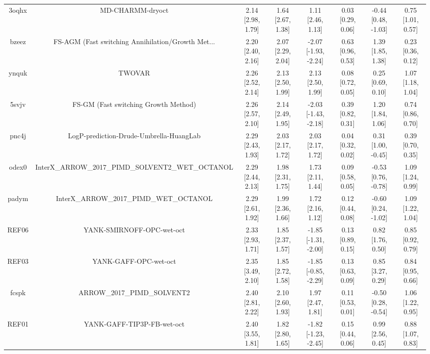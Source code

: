 \documentclass{article}
\begin{document}
\begin{center}
\begin{longtable}{|cccccccc|}
 3oqhx &                                   MD-CHARMM-dryoct &  2.14 [2.98, 1.79] &  1.64 [2.67, 1.38] &     1.11 [2.46, 1.13] &  0.03 [0.29, 0.06] &   -0.44 [0.48, -1.03] &     0.75 [1.01, 0.57] \\
 bzeez &  FS-AGM (Fast switching Annihilation/Growth Met... &  2.20 [2.40, 2.16] &  2.07 [2.29, 2.04] &  -2.07 [-1.93, -2.24] &  0.63 [0.96, 0.53] &     1.39 [1.85, 1.38] &     0.23 [0.36, 0.12] \\
 ynquk &                                             TWOVAR &  2.26 [2.52, 2.14] &  2.13 [2.50, 1.99] &     2.13 [2.50, 1.99] &  0.08 [0.72, 0.05] &     0.25 [0.69, 0.10] &     1.07 [1.18, 1.04] \\
 5svjv &               FS-GM (Fast switching Growth Method) &  2.26 [2.57, 2.10] &  2.14 [2.49, 1.95] &  -2.03 [-1.43, -2.18] &  0.39 [0.82, 0.31] &     1.20 [1.84, 1.06] &     0.74 [0.86, 0.70] \\
 pnc4j &            LogP-prediction-Drude-Umbrella-HuangLab &  2.29 [2.43, 1.93] &  2.03 [2.17, 1.72] &     2.03 [2.17, 1.72] &  0.04 [0.32, 0.02] &    0.31 [1.00, -0.45] &     0.39 [0.70, 0.35] \\
 odex0 &  InterX\_ARROW\_2017\_PIMD\_SOLVENT2\_WET\_OCTANOL &  2.29 [2.44, 2.13] &  1.98 [2.31, 1.75] &     1.73 [2.11, 1.44] &  0.09 [0.58, 0.05] &   -0.53 [0.76, -0.78] &     1.09 [1.24, 0.99] \\
 padym &            InterX\_ARROW\_2017\_PIMD\_WET\_OCTANOL &  2.29 [2.61, 1.92] &  1.99 [2.36, 1.66] &     1.72 [2.16, 1.12] &  0.12 [0.44, 0.08] &   -0.60 [0.24, -1.02] &     1.09 [1.22, 1.04] \\
 REF06 &                          YANK-SMIRNOFF-OPC-wet-oct &  2.33 [2.93, 1.71] &  1.85 [2.37, 1.57] &  -1.85 [-1.31, -2.00] &  0.13 [0.89, 0.15] &     0.82 [1.76, 0.50] &     0.85 [0.92, 0.79] \\
 REF03 &                              YANK-GAFF-OPC-wet-oct &  2.35 [3.49, 2.10] &  1.85 [2.72, 1.58] &  -1.85 [-0.85, -2.29] &  0.13 [0.63, 0.09] &     0.85 [3.27, 0.29] &     0.84 [0.95, 0.66] \\
 fcspk &                        ARROW\_2017\_PIMD\_SOLVENT2 &  2.40 [2.81, 2.22] &  2.10 [2.60, 1.93] &     1.97 [2.47, 1.81] &  0.11 [0.53, 0.01] &   -0.50 [0.28, -0.54] &     1.06 [1.22, 0.95] \\
 REF01 &                         YANK-GAFF-TIP3P-FB-wet-oct &  2.40 [3.55, 1.81] &  1.82 [2.80, 1.65] &  -1.82 [-1.23, -2.45] &  0.15 [0.44, 0.06] &     0.99 [2.56, 0.45] &     0.88 [1.07, 0.83] \\

\end{longtable}
\end{center}
\end{document}
